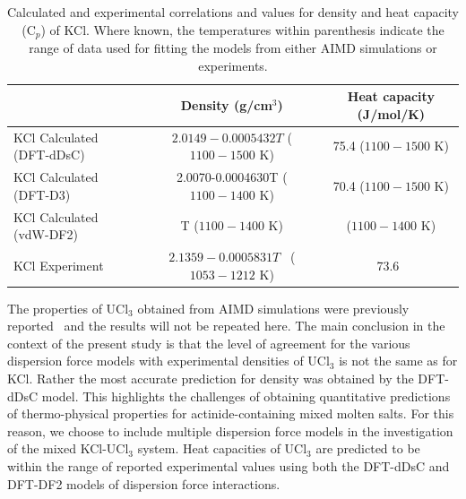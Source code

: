 \documentclass[preprint,3p,10pt,twocolumn,number,sort&compress]{elsarticle}
\begin{document}
\begin{table}[hb!]
\centering
\begin{tabular}{lcc}
\hline
\hline
& Density (g/cm$^3$) &Heat capacity (J/mol/K) \\
\hline
KCl Calculated (DFT-dDsC)	&$2.0149-0.0005432T$ ($1100 - 1500$ K) &75.4 ($1100 - 1500$ K)\\
KCl Calculated (DFT-D3)	&2.0070-0.0004630T ($1100 - 1400$ K)& 70.4 ($1100 - 1500$ K)\\
KCl Calculated (vdW-DF2)	& T ($1100 - 1400$ K)& ($1100 - 1400$ K)\\
KCl Experiment	&$2.1359-0.0005831 T$~\cite{Janz1988} ($1053-1212$ K) &73.6~\cite{NIST} \\	
\hline
\hline
\end{tabular}
\caption{Calculated and experimental correlations and values for density and heat capacity (C$_p$) of KCl. Where known, the temperatures within parenthesis indicate the range of data used for fitting the models from either AIMD simulations or experiments.}
\label{table:KCldensityetc}
\end{table}

The properties of UCl$_3$ obtained from AIMD simulations were previously reported~\cite{Andersson} and the results will not be repeated here. The main conclusion in the context of the present study is that the level of agreement for the various dispersion force models with experimental densities of UCl$_3$ is not the same as for KCl. Rather the most accurate prediction for density was obtained by the DFT-dDsC model. 
This highlights the challenges of obtaining quantitative predictions of thermo-physical properties for actinide-containing mixed molten salts. For this reason, we choose to include multiple dispersion force models in the investigation of the mixed KCl-UCl$_3$ system. 
Heat capacities of UCl$_3$ are predicted to be within the range of reported experimental values using both the DFT-dDsC and DFT-DF2 models of dispersion force interactions.
\end{document}
